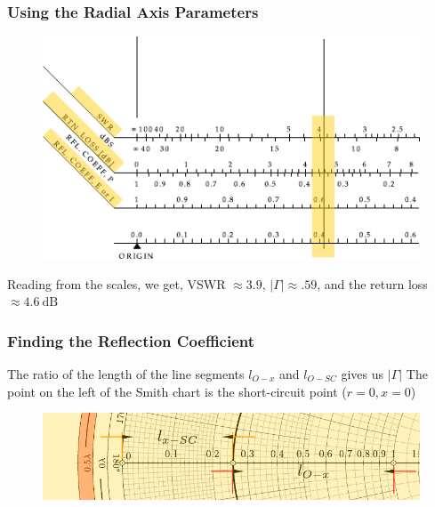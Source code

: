 \documentclass[10pt, compress]{beamer}
\begin{document}
\begin{frame}
    \frametitle{Using the Radial Axis Parameters}
    \begin{figure}[T!]
        \centering
        \includegraphics[width=.9\textwidth]{radial axis.pdf}
    \end{figure}
    \begin{outline}
        \1 Reading from the scales, we get, VSWR $\approx 3.9$, $|\Gamma| \approx .59$, and the return loss $\approx \SI{4.6}{\dB}$
    \end{outline}

\end{frame}
\begin{frame}
    \frametitle{Finding the Reflection Coefficient}
\begin{outline}
    \1 The ratio of the length of the line segments $l_{O - x}$ and $l_{O - SC}$ gives us $|\Gamma|$
    \1 The point on the left of the Smith chart is the short-circuit point ($r = 0, x = 0$)
\end{outline}
\begin{figure}[T!]
    \centering
    \includegraphics[width=.9\textwidth]{smith example Gamma_cropped.pdf}
\end{figure}

\end{frame}
\end{document}
